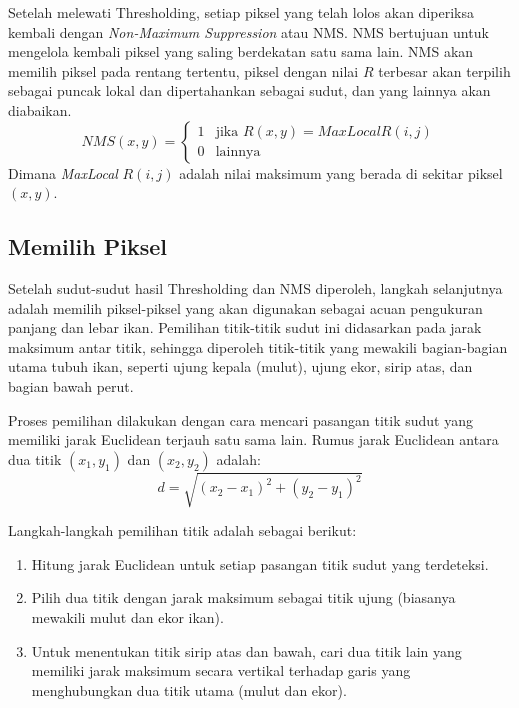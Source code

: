    Setelah melewati Thresholding, setiap piksel yang telah lolos akan diperiksa kembali dengan \emph{Non-Maximum Suppression} atau NMS.
NMS bertujuan untuk mengelola kembali piksel yang saling berdekatan satu sama lain. NMS akan memilih piksel pada rentang tertentu, piksel dengan nilai \(R\) terbesar akan terpilih sebagai puncak lokal dan dipertahankan sebagai sudut, dan yang lainnya akan diabaikan.
\begin{equation*}
    NMS(x,y) =
    \begin{cases}
        1 & \text{jika } R(x,y) = MaxLocal R(i,j) \\
        0 & \text{lainnya }
    \end{cases}
\end{equation*}
Dimana \emph{MaxLocal} \(R(i,j)\) adalah nilai maksimum yang berada di sekitar piksel \((x,y)\).

\subsection{Memilih Piksel}
    Setelah sudut-sudut hasil Thresholding dan NMS diperoleh, langkah selanjutnya adalah memilih piksel-piksel yang akan digunakan sebagai acuan pengukuran panjang dan lebar ikan. Pemilihan titik-titik sudut ini didasarkan pada jarak maksimum antar titik, sehingga diperoleh titik-titik yang mewakili bagian-bagian utama tubuh ikan, seperti ujung kepala (mulut), ujung ekor, sirip atas, dan bagian bawah perut.

    Proses pemilihan dilakukan dengan cara mencari pasangan titik sudut yang memiliki jarak Euclidean terjauh satu sama lain. Rumus jarak Euclidean antara dua titik \((x_1, y_1)\) dan \((x_2, y_2)\) adalah:
\begin{equation}
    d = \sqrt{(x_2 - x_1)^2 + (y_2 - y_1)^2}
\end{equation}

    Langkah-langkah pemilihan titik adalah sebagai berikut:
\begin{enumerate}
    \item Hitung jarak Euclidean untuk setiap pasangan titik sudut yang terdeteksi.
    \item Pilih dua titik dengan jarak maksimum sebagai titik ujung (biasanya mewakili mulut dan ekor ikan).
    \item Untuk menentukan titik sirip atas dan bawah, cari dua titik lain yang memiliki jarak maksimum secara vertikal terhadap garis yang menghubungkan dua titik utama (mulut dan ekor).
\end{enumerate}

